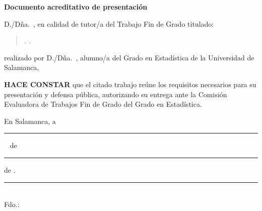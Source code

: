 \thispagestyle{empty}

\begin{center}
{\Large\bfseries Documento acreditativo de presentación}
\end{center}

\vspace{1cm}

\noindent D./Dña.~\TFGTutor, en calidad de tutor/a del Trabajo Fin de Grado
titulado:

\vspace{0.4cm}
\begin{quote}\itshape
\TFGTitulo. \TFGSubtitulo.
\end{quote}
\vspace{0.4cm}

\noindent realizado por D./Dña.~\TFGAutor, alumno/a del Grado en Estadística de
la Universidad de Salamanca,

\vspace{0.4cm}

\noindent \textbf{HACE CONSTAR} que el citado trabajo reúne los requisitos
necesarios para su presentación y defensa pública, autorizando su entrega
ante la Comisión Evaluadora de Trabajos Fin de Grado del Grado en Estadística.

\vspace{2cm}

\noindent En Salamanca, a \rule{2cm}{0.4pt}~ de \rule{3.5cm}{0.4pt} de \TFGAnio.

\vspace{2cm}

\begin{flushright}
\rule{6cm}{0.4pt}\\
Fdo.: \TFGTutor
\end{flushright}

\clearpage

